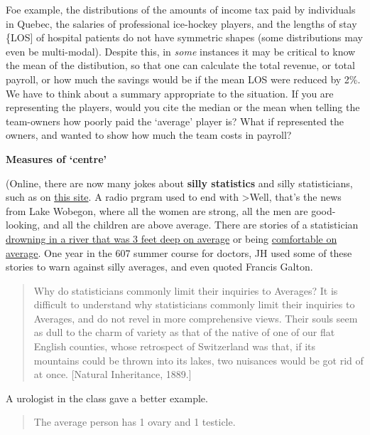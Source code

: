 \documentclass[
]{article}
\begin{document}
Foe example, the distributions of the amounts of income tax paid by
individuals in Quebec, the salaries of professional ice-hockey players,
and the lengths of stay \{LOS{]} of hospital patients do not have
symmetric shapes (some distributions may even be multi-modal). Despite
this, in \emph{some} instances it may be critical to know the mean of
the distibution, so that one can calculate the total revenue, or total
payroll, or how much the savings would be if the mean LOS were reduced
by 2\%. We have to think about a summary appropriate to the situation.
If you are representing the players, would you cite the median or the
mean when telling the team-owners how poorly paid the `average' player
is? What if represented the owners, and wanted to show how much the team
costs in payroll?

\textbf{Measures of `centre'}

(Online, there are now many jokes about \textbf{silly statistics} and
silly statisticians, such as on
\href{http://www.workjoke.com/statisticians-jokes.html}{this site}. A
radio prgram used to end with \textgreater Well, that's the news from
Lake Wobegon, where all the women are strong, all the men are
good-looking, and all the children are above average. There are stories
of a statistician
\href{https://ask.metafilter.com/261337/Source-of-well-known-joke-about-statisticians}{drowning
in a river that was 3 feet deep on average} or being
\href{https://www.barrypopik.com/index.php/new_york_city/entry/head_in_the_oven_feet_in_the_freezer}{comfortable
on average}. One year in the 607 summer course for doctors, JH used some
of these stories to warn against silly averages, and even quoted Francis
Galton.

\begin{quote}
Why do statisticians commonly limit their inquiries to Averages? It is
difficult to understand why statisticians commonly limit their inquiries
to Averages, and do not revel in more comprehensive views. Their souls
seem as dull to the charm of variety as that of the native of one of our
flat English counties, whose retrospect of Switzerland was that, if its
mountains could be thrown into its lakes, two nuisances would be got rid
of at once. {[}Natural Inheritance, 1889.{]}
\end{quote}

A urologist in the class gave a better example.

\begin{quote}
The average person has 1 ovary and 1 testicle.
\end{quote}
\end{document}
